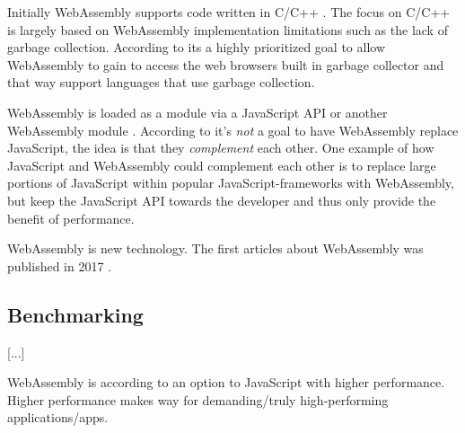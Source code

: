 Initially WebAssembly supports code written in C/C++ \parencite{HaasRossbergSchuffTitzerHolmanGohmanWagnerZakaiBastien2017}. 
The focus on C/C++ is largely based on WebAssembly implementation limitations such as the lack of garbage collection. According to \textcite{HaasRossbergSchuffTitzerHolmanGohmanWagnerZakaiBastien2017} its a highly prioritized goal to allow WebAssembly to gain to access the web browsers built in garbage collector and that way support languages that use garbage collection.

WebAssembly is loaded as a module via a JavaScript API or another WebAssembly module \parencite{HaasRossbergSchuffTitzerHolmanGohmanWagnerZakaiBastien2017}. According to \textcite{Moller2018} it's \emph{not} a goal to have WebAssembly replace JavaScript, the idea is that they \emph{complement} each other. One example of how JavaScript and WebAssembly could complement each other is to replace large portions of JavaScript within popular JavaScript-frameworks with WebAssembly, but keep the JavaScript API towards the developer and thus only provide the benefit of performance.

WebAssembly is new technology. The first articles about WebAssembly was published in 2017 \parencite{HaasRossbergSchuffTitzerHolmanGohmanWagnerZakaiBastien2017,ReiserBlaser2017}.

\subsection{Benchmarking}

\parencite{LehmannPradel2018,MalleGiulianiKiesebergHolzinger2018}

[...]

WebAssembly is according to \textcite{HaasRossbergSchuffTitzerHolmanGohmanWagnerZakaiBastien2017} an option to JavaScript with higher performance. Higher performance makes way for demanding/truly high-performing applications/apps.
